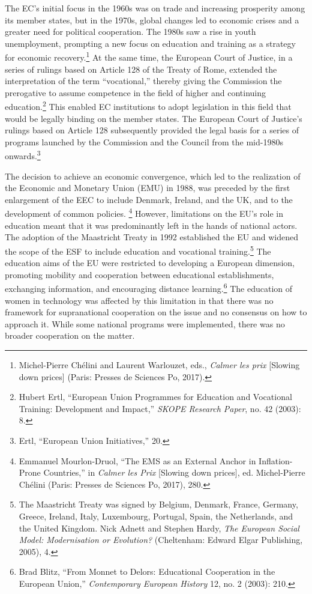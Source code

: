\documentclass{tufte-handout}
\begin{document}
The EC's initial focus in the 1960s was on trade and increasing
prosperity among its member states, but in the 1970s, global changes led
to economic crises and a greater need for political cooperation. The
1980s saw a rise in youth unemployment, prompting a new focus on
education and training as a strategy for economic recovery.\footnote{Michel-Pierre
  Chélini and Laurent Warlouzet, eds., \emph{Calmer les prix} {[}Slowing
  down prices{]} (Paris: Presses de Sciences Po, 2017).} At the same
time, the European Court of Justice, in a series of rulings based on
Article 128 of the Treaty of Rome, extended the interpretation of the
term ``vocational,'' thereby giving the Commission the prerogative to
assume competence in the field of higher and continuing
education.\footnote{Hubert Ertl, ``European Union Programmes for
  Education and Vocational Training: Development and Impact,''
  \emph{SKOPE Research Paper}, no. 42 (2003): 8.} This enabled EC
institutions to adopt legislation in this field that would be legally
binding on the member states. The European Court of Justice's rulings
based on Article 128 subsequently provided the legal basis for a series
of programs launched by the Commission and the Council from the
mid-1980s onwards.\footnote{Ertl, ``European Union Initiatives,'' 20.}

The decision to achieve an economic convergence, which led to the
realization of the Economic and Monetary Union (EMU) in 1988, was
preceded by the first enlargement of the EEC to include Denmark,
Ireland, and the UK, and to the development of common policies.
\footnote{Emmanuel Mourlon-Druol, ``The EMS as an External Anchor in
  Inflation-Prone Countries,'' in \emph{Calmer les Prix} {[}Slowing down
  prices{]}, ed. Michel-Pierre Chélini (Paris: Presses de Sciences Po,
  2017), 280.} However, limitations on the EU's role in education meant
that it was predominantly left in the hands of national actors. The
adoption of the Maastricht Treaty in 1992 established the EU and widened
the scope of the ESF to include education and vocational
training.\footnote{The Maastricht Treaty was signed by Belgium, Denmark,
  France, Germany, Greece, Ireland, Italy, Luxembourg, Portugal, Spain,
  the Netherlands, and the United Kingdom. Nick Adnett and Stephen
  Hardy, \emph{The European Social Model: Modernisation or Evolution?}
  (Cheltenham: Edward Elgar Publishing, 2005), 4.} The education aims of
the EU were restricted to developing a European dimension, promoting
mobility and cooperation between educational establishments, exchanging
information, and encouraging distance learning.\footnote{Brad Blitz,
  ``From Monnet to Delors: Educational Cooperation in the European
  Union,'' \emph{Contemporary European History} 12, no. 2 (2003): 210.}
The education of women in technology was affected by this limitation in
that there was no framework for supranational cooperation on the issue
and no consensus on how to approach it. While some national programs
were implemented, there was no broader cooperation on the matter.
\end{document}
